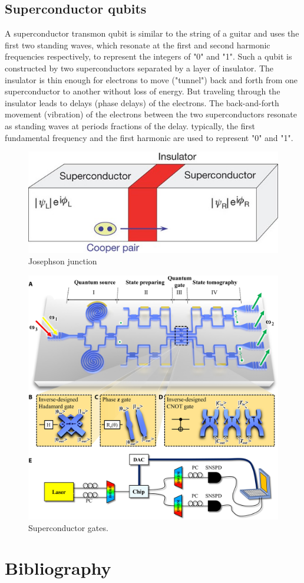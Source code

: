 \documentclass[oneside, letter, 12pt]{book}
\begin{document}
\section{Superconductor qubits}
A superconductor transmon qubit is similar to the string of a guitar and uses the first two standing waves, which resonate at the first and second harmonic frequencies respectively, to represent the integers of "0" and "1". Such a qubit is constructed by two superconductors separated by a layer of insulator. The insulator is thin enough for electrons to move ("tunnel") back and forth from one superconductor to another without loss of energy. But traveling through the insulator leads to delays (phase delays) of the electrons. The back-and-forth movement (vibration) of the electrons between the two superconductors resonate as standing waves at periods fractions of the delay. typically, the first fundamental frequency and the first harmonic are used to represent "0" and "1".
\begin{figure}[ht]
\includegraphics[width=12cm]{pic/supercQubit.jpg}
\caption{Josephson junction}
\label{Superconductor}
\end{figure}

\begin{figure}[ht]
\includegraphics[width=12cm]{pic/superGates.jpg}
\caption{Superconductor gates.}
\label{superGates}
\end{figure}


\chapter*{Bibliography}

   

\printindex
\end{document}
